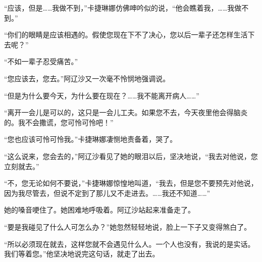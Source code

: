\par “应该，但是……我做不到，”卡捷琳娜仿佛呻吟似的说，“他会瞧着我，……我做不到。”
\par “你们的眼睛是应该相遇的。假使您现在下不了决心，您以后一辈子还怎样生活下去呢？”
\par “不如一辈子忍受痛苦。”
\par “您应该去，您去。”阿辽沙又一次毫不怜悯地强调说。
\par “但是为什么要今天，为什么要在现在？……我不能离开病人……”
\par “离开一会儿是可以的，这只是一会儿工夫。如果您不去，今天夜里他会得脑炎的。我不会撒谎，您可怜可怜吧！”
\par “您也应该可怜可怜我。”卡捷琳娜凄恻地责备着，哭了。
\par “这么说来，您会去的，”阿辽沙看见了她的眼泪以后，坚决地说，“我去对他说，您立刻就去。”
\par “不，您无论如何不要说，”卡捷琳娜惊惶地叫道，“我去，但是您不要预先对他说，因为我尽管去，但说不定到了那儿又不走进去。……我还不知道……”
\par 她的嗓音哽住了。她困难地呼吸着。阿辽沙站起来准备走了。
\par “要是我碰见了什么人可怎么办？”她忽然轻轻地说，脸上一下子又变得煞白了。
\par “所以必须现在就去，这样您就不会遇见什么人。一个人也没有，我说的是实话。我们等着您。”他坚决地说完这句话，就走了出去。
